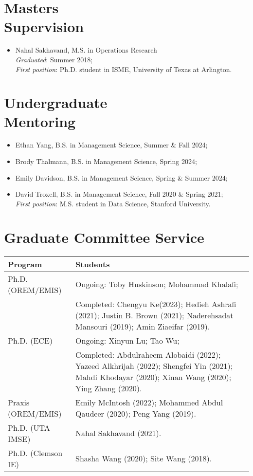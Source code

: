 \documentclass[hyperref, margin]{myResume}
\begin{document}
\begin{resume}
	\vspace{-0.2cm}
\section{Masters \\Supervision}
	\begin{itemize}[leftmargin=*]\itemsep0em
		\item Nahal Sakhavand, M.S. in Operations Research\\		
		\emph{Graduated}: Summer 2018;\\ 
		\emph{First position}: Ph.D. student in ISME, University of Texas at Arlington.
	\end{itemize}
	\vspace{-0.2cm}	
	
\section{Undergraduate \\Mentoring}
	\begin{itemize}[leftmargin=*]\itemsep0em
		\item Ethan Yang, B.S. in Management Science, Summer \& Fall 2024;			
		\item Brody Thalmann, B.S. in Management Science, Spring 2024;	
		\item Emily Davidson, B.S. in Management Science, Spring \& Summer 2024;
		\item David Troxell, B.S. in Management Science, Fall 2020 \& Spring 2021;\\
		\emph{First position}: M.S. student in Data Science, Stanford University.	
	\end{itemize}

\section{Graduate Committee Service}
	\vspace*{0.5cm}
	\begin{longtable}{p{} p{}}
			\hline
			Program & Students \\ 
			\hline
			Ph.D. (OREM/EMIS) 	& Ongoing: Toby Huskinson; Mohammad Khalafi; \\[3pt]
								& Completed: Chengyu Ke(2023); Hedieh Ashrafi (2021); Justin B. Brown (2021); Naderehsadat Mansouri (2019); Amin Ziaeifar (2019). \\[3pt] \hline
			Ph.D. (ECE)  		& Ongoing: Xinyun Lu; Tao Wu; \\ [3pt]
								& Completed: Abdulraheem Alobaidi (2022); Yazeed Alkhrijah (2022); Shengfei Yin (2021); Mahdi Khodayar (2020); Xinan Wang (2020); Ying Zhang (2020). \\ [3pt]\hline
			Praxis (OREM/EMIS)	& Emily McIntosh (2022); Mohammed Abdul Qaudeer (2020); Peng Yang (2019). \\ [3pt]\hline
			Ph.D. (UTA IMSE)	& Nahal Sakhavand (2021). \\ [3pt] \hline
			Ph.D. (Clemson IE)	& Shasha Wang (2020); Site Wang (2018). \\ [3pt]\hline
	\end{longtable}
	

\end{resume}
\end{document}
